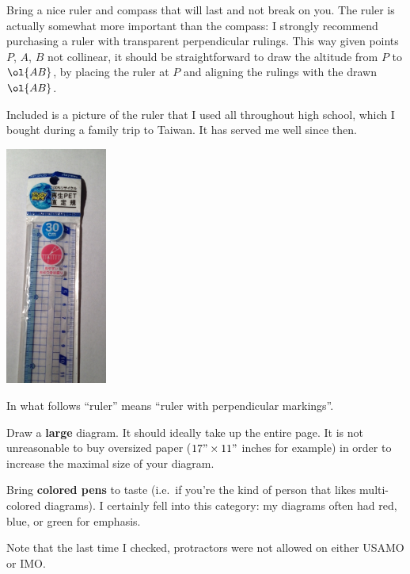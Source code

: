 \documentclass[11pt]{scrartcl}
\begin{document}
\begin{itemize}
  \ii Bring a nice ruler and compass that will last and not break on you.
  The ruler is actually somewhat more important than the compass:
  I strongly recommend purchasing a ruler with transparent perpendicular rulings.
  This way given points $P$, $A$, $B$ not collinear,
  it should be straightforward to draw the altitude from $P$ to $\ol{AB}$,
  by placing the ruler at $P$ and aligning the rulings with the drawn $\ol{AB}$.

  Included is a picture of the ruler that I used all throughout high school,
  which I bought during a family trip to Taiwan. It has served me well since then.
  \begin{center}
    \includegraphics[width=0.25\textwidth]{ruler.jpg}
  \end{center}

  In what follows ``ruler'' means ``ruler with perpendicular markings''.

  \ii Draw a \textbf{large} diagram.
  It should ideally take up the entire page.
  It is not unreasonable to buy oversized paper
  ($17" \times 11"$ inches for example)
  in order to increase the maximal size of your diagram.

  \ii Bring \textbf{colored pens} to taste
  (i.e.\ if you're the kind of person that likes multi-colored diagrams).
  I certainly fell into this category:
  my diagrams often had red, blue, or green for emphasis.

\end{itemize}
Note that the last time I checked,
protractors were not allowed on either USAMO or IMO.
\end{document}
